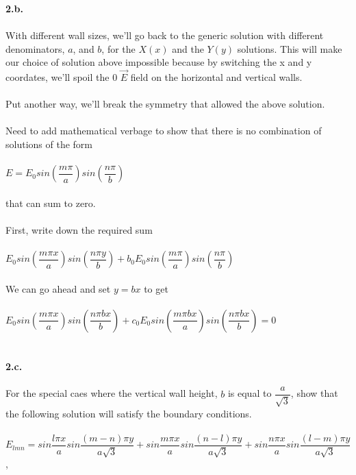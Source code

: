 \documentclass[prb,preprint]
{revtex4-1}
\newcommand{\PRLsep}{\noindent\makebox[\linewidth]{\resizebox{0.8888\linewidth}{2pt}{$\bullet$}}\bigskip}
\begin{document}
\\
\\
\PRLsep
\\
\newpage
\textbf{2.b.}
\\
\\
With different wall sizes, we'll go back to the generic solution with different denominators, $a$, and $b$, for the $X\left(x\right)$ and the $Y\left(y\right)$ solutions.  This will make our choice of solution above impossible because by switching the x and y coordates, we'll spoil the 0 $\vec{E}$ field on the horizontal and vertical walls.  
\\
\\
Put another way, we'll break the symmetry that allowed the above solution.
\\
\\
Need to add mathematical verbage to show that there is no combination of solutions of the form 
\\
\\
$E = E_0 sin\left(\dfrac{m\pi}{a}\right)sin\left(\dfrac{n\pi}{b}\right)$
\\
\\
that can sum to zero.
\\
\\
First, write down the required sum
\\
\\
$E_0 sin\left(\dfrac{m\pi x}{a}\right)sin\left(\dfrac{n\pi y}{b}\right) + b_0E_0 sin\left(\dfrac{m\pi}{a}\right)sin\left(\dfrac{n\pi}{b}\right)$
\\
\\
We can go ahead and set $y = bx$ to get
\\
\\
$E_0 sin\left(\dfrac{m\pi x}{a}\right)sin\left(\dfrac{n\pi bx}{b}\right) + c_0 E_0 sin\left(\dfrac{m\pi bx}{a}\right)sin\left(\dfrac{n\pi bx}{b}\right) = 0$
\\
\\
\PRLsep
\\
\newpage
\textbf{2.c.}
\\
\\
For the special caes where the vertical wall height, $b$ is equal to $\dfrac{a}{\sqrt{3}}$, show that the following solution will satisfy the boundary conditions.
\\
\\
$E_{lmn} = sin\dfrac{l\pi x}{a} sin\dfrac{\left(m-n\right)\pi y}{a\sqrt{3}} + sin\dfrac{m\pi x}{a} sin\dfrac{\left(n-l\right)\pi y}{a\sqrt{3}} + sin\dfrac{n\pi x}{a} sin\dfrac{\left(l-m\right)\pi y}{a\sqrt{3}}$,
\end{document}
